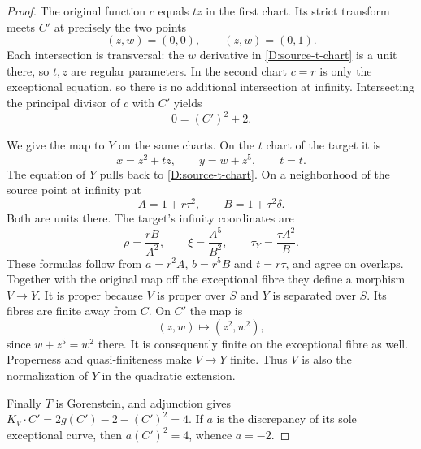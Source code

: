 \begin{proof}
The original function $c$ equals $tz$ in the first chart.
Its strict transform meets $C'$ at precisely the two points
\[
                    (z,w)=(0,0),\qquad (z,w)=(0,1).
\]
Each intersection is transversal: the $w$ derivative in
\eqref{D:source-t-chart} is a unit there, so $t,z$ are
regular parameters.  In the second chart $c=r$ is only
the exceptional equation, so there is no additional
intersection at infinity.  Intersecting the principal
divisor of $c$ with $C'$ yields
\[
                            0=(C')^2+2.
\]

We give the map to $Y$ on the same charts.  On the $t$
chart of the target it is
\[
                    x=z^2+tz,\qquad y=w+z^5,\qquad t=t.
\]
The equation of $Y$ pulls back to
\eqref{D:source-t-chart}.  On a neighborhood of the source
point at infinity put
\[
             A=1+r\tau^2,\qquad B=1+\tau^2\delta.
\]
Both are units there.  The target's infinity coordinates
are
\[
             \rho=\frac{rB}{A^2},\qquad
             \xi=\frac{A^5}{B^2},\qquad
             \tau_Y=\frac{\tau A^2}{B}.
\]
These formulas follow from $a=r^2A$, $b=r^5B$ and $t=r\tau$,
and agree on overlaps.  Together with the original map off
the exceptional fibre they define a morphism $V\to Y$.
It is proper because $V$ is proper over $S$ and $Y$ is
separated over $S$.  Its fibres are finite away from $C$.
On $C'$ the map is
\[
                      (z,w)\longmapsto(z^2,w^2),
\]
since $w+z^5=w^2$ there.  It is consequently finite on
the exceptional fibre as well.  Properness and
quasi-finiteness make $V\to Y$ finite.  Thus $V$ is also
the normalization of $Y$ in the quadratic extension.

Finally $T$ is Gorenstein, and adjunction gives
$K_V\cdot C'=2g(C')-2-(C')^2=4$.  If $a$ is the
discrepancy of its sole exceptional curve, then
$a(C')^2=4$, whence $a=-2$.
\end{proof}

